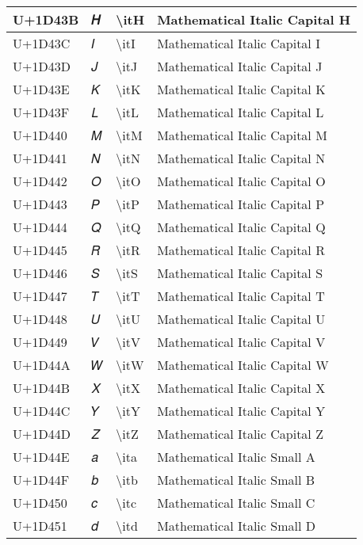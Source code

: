 \begin{table}[h]
\begin{tabulary}{\linewidth}{|L|L|L|L|}
\hline
U+1D43B & 𝐻 & {\textbackslash}itH & Mathematical Italic Capital H \\
\hline
U+1D43C & 𝐼 & {\textbackslash}itI & Mathematical Italic Capital I \\
\hline
U+1D43D & 𝐽 & {\textbackslash}itJ & Mathematical Italic Capital J \\
\hline
U+1D43E & 𝐾 & {\textbackslash}itK & Mathematical Italic Capital K \\
\hline
U+1D43F & 𝐿 & {\textbackslash}itL & Mathematical Italic Capital L \\
\hline
U+1D440 & 𝑀 & {\textbackslash}itM & Mathematical Italic Capital M \\
\hline
U+1D441 & 𝑁 & {\textbackslash}itN & Mathematical Italic Capital N \\
\hline
U+1D442 & 𝑂 & {\textbackslash}itO & Mathematical Italic Capital O \\
\hline
U+1D443 & 𝑃 & {\textbackslash}itP & Mathematical Italic Capital P \\
\hline
U+1D444 & 𝑄 & {\textbackslash}itQ & Mathematical Italic Capital Q \\
\hline
U+1D445 & 𝑅 & {\textbackslash}itR & Mathematical Italic Capital R \\
\hline
U+1D446 & 𝑆 & {\textbackslash}itS & Mathematical Italic Capital S \\
\hline
U+1D447 & 𝑇 & {\textbackslash}itT & Mathematical Italic Capital T \\
\hline
U+1D448 & 𝑈 & {\textbackslash}itU & Mathematical Italic Capital U \\
\hline
U+1D449 & 𝑉 & {\textbackslash}itV & Mathematical Italic Capital V \\
\hline
U+1D44A & 𝑊 & {\textbackslash}itW & Mathematical Italic Capital W \\
\hline
U+1D44B & 𝑋 & {\textbackslash}itX & Mathematical Italic Capital X \\
\hline
U+1D44C & 𝑌 & {\textbackslash}itY & Mathematical Italic Capital Y \\
\hline
U+1D44D & 𝑍 & {\textbackslash}itZ & Mathematical Italic Capital Z \\
\hline
U+1D44E & 𝑎 & {\textbackslash}ita & Mathematical Italic Small A \\
\hline
U+1D44F & 𝑏 & {\textbackslash}itb & Mathematical Italic Small B \\
\hline
U+1D450 & 𝑐 & {\textbackslash}itc & Mathematical Italic Small C \\
\hline
U+1D451 & 𝑑 & {\textbackslash}itd & Mathematical Italic Small D \\

\end{tabulary}
\end{table}
